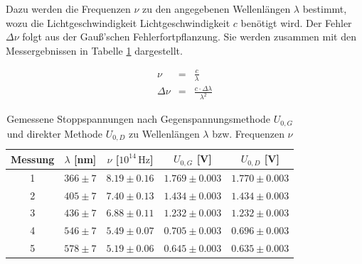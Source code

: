 \documentclass[12pt,a4paper]{scrartcl}
\numberwithin{equation}{section} %
\begin{document}
Dazu werden die Frequenzen $\nu$ zu den angegebenen Wellenlängen $\lambda$ bestimmt, wozu die Lichtgeschwindigkeit Lichtgeschwindigkeit $c$ benötigt wird. Der Fehler $\Delta \nu$ folgt aus der Gauß'schen Fehlerfortpflanzung. Sie werden zusammen mit den Messergebnissen in Tabelle \ref{table:Messwerte Energie} dargestellt.

\begin{eqnarray}
	\nu &=& \frac{c}{\lambda} \label{eq:frequenzWellenlänge} \\
	\Delta \nu &=& \frac{c \cdot \Delta \lambda}{\lambda^2}
\end{eqnarray}

\begin{table}[h!]
	\centering
	\begin{tabular}{c|c|c|c|c}
		Messung & $\lambda$ [nm] & $\nu$ [$10^{14} \mathrm{\, Hz}$] & $U_{0,G}$ [V] & $U_{0,D}$ [V] \\
		\hline
		1 & $366 \pm 7$ & $8.19 \pm 0.16$ & $1.769 \pm 0.003$ & $1.770 \pm 0.003$ \\
		2 & $405 \pm 7$ & $7.40 \pm 0.13$ & $1.434 \pm 0.003$ & $1.434 \pm 0.003$ \\
		3 & $436 \pm 7$ & $6.88 \pm 0.11$ & $1.232 \pm 0.003$ & $1.232 \pm 0.003$ \\
		4 & $546 \pm 7$ & $5.49 \pm 0.07$ & $0.705 \pm 0.003$ & $0.696 \pm 0.003$ \\
		5 & $578 \pm 7$ & $5.19 \pm 0.06$ & $0.645 \pm 0.003$ & $0.635 \pm 0.003$
	\end{tabular}
	\caption{Gemessene Stoppspannungen nach Gegenspannungsmethode $U_{0,G}$ und direkter Methode $U_{0,D}$ zu Wellenlängen $\lambda$ bzw. Frequenzen $\nu$}
	\label{table:Messwerte Energie}
\end{table}
\end{document}
